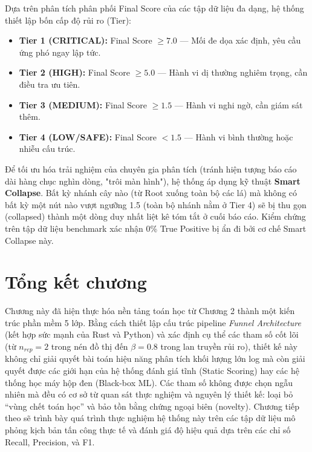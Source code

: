 \documentclass[../main.tex]{subfiles}
\begin{document}
Dựa trên phân tích phân phối Final Score của các tập dữ liệu đa dạng, hệ thống thiết lập bốn cấp độ rủi ro (Tier):
\begin{itemize}
    \item \textbf{Tier 1 (CRITICAL):} Final Score $\ge 7.0$ — Mối đe dọa xác định, yêu cầu ứng phó ngay lập tức.
    \item \textbf{Tier 2 (HIGH):} Final Score $\ge 5.0$ — Hành vi dị thường nghiêm trọng, cần điều tra ưu tiên.
    \item \textbf{Tier 3 (MEDIUM):} Final Score $\ge 1.5$ — Hành vi nghi ngờ, cần giám sát thêm.
    \item \textbf{Tier 4 (LOW/SAFE):} Final Score $< 1.5$ — Hành vi bình thường hoặc nhiễu cấu trúc.
\end{itemize}

Để tối ưu hóa trải nghiệm của chuyên gia phân tích (tránh hiện tượng báo cáo dài hàng chục nghìn dòng, "trôi màn hình"), hệ thống áp dụng kỹ thuật \textbf{Smart Collapse}. Bất kỳ nhánh cây nào (từ Root xuống toàn bộ các lá) mà không có bất kỳ một nút nào vượt ngưỡng 1.5 (toàn bộ nhánh nằm ở Tier 4) sẽ bị thu gọn (collapsed) thành một dòng duy nhất liệt kê tóm tắt ở cuối báo cáo. Kiểm chứng trên tập dữ liệu benchmark xác nhận 0\% True Positive bị ẩn đi bởi cơ chế Smart Collapse này.
\section{Tổng kết chương}
\label{section:3.9}

Chương này đã hiện thực hóa nền tảng toán học từ Chương 2 thành một kiến trúc phần mềm 5 lớp. Bằng cách thiết lập cấu trúc pipeline \textit{Funnel Architecture} (kết hợp sức mạnh của Rust và Python) và xác định cụ thể các tham số cốt lõi (từ $n_{rep}=2$ trong nén đồ thị đến $\beta=0.8$ trong lan truyền rủi ro), thiết kế này không chỉ giải quyết bài toán hiệu năng phân tích khối lượng lớn log mà còn giải quyết được các giới hạn của hệ thống đánh giá tĩnh (Static Scoring) hay các hệ thống học máy hộp đen (Black-box ML). Các tham số không được chọn ngẫu nhiên mà đều có cơ sở từ quan sát thực nghiệm và nguyên lý thiết kế: loại bỏ ``vùng chết toán học'' và bảo tồn bằng chứng ngoại biên (novelty). Chương tiếp theo sẽ trình bày quá trình thực nghiệm hệ thống này trên các tập dữ liệu mô phỏng kịch bản tấn công thực tế và đánh giá độ hiệu quả dựa trên các chỉ số Recall, Precision, và F1.
\end{document}
